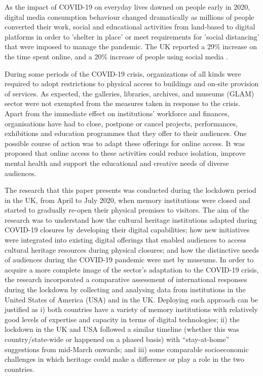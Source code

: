 \documentclass{egpubl}
\begin{document}
As the impact of COVID-19 on everyday lives dawned on people early in 2020, digital media consumption behaviour changed dramatically as millions of people converted their work, social and educational activities from land-based to digital platforms in order to 'shelter in place' or meet requirements for 'social distancing' that were imposed to manage the pandemic. The UK reported a 29\% increase on the time spent online, and a 20\% increase of people using social media \cite{ofcom:2020}. 

During some periods of the COVID-19 crisis, organizations of all kinds were required to adopt restrictions to physical access to buildings and on-site provision of services. As expected, the galleries, libraries, archives, and museums (GLAM) sector were not exempted from the measures taken in response to the crisis. Apart from the immediate effect on institutions' workforce and finances, organisations have had to close, postpone or cancel projects, performances, exhibitions and education programmes that they offer to their audiences. One possible course of action was to adapt these offerings for online access. It was proposed that online access to these activities could reduce isolation, improve mental health and support the educational and creative needs of diverse audiences.

The research that this paper presents was conducted during the lockdown period in the UK, from April to July 2020, when memory institutions were closed and started to gradually re-open their physical premises to visitors. The aim of the research was to understand how the cultural heritage institutions adapted during COVID-19 closures by developing their digital capabilities; how new initiatives were integrated into existing digital offerings that enabled audiences to access cultural heritage resources during physical closures; and how the distinctive needs of audiences during the COVID-19 pandemic were met by museums. In order to acquire a more complete image of the sector's adaptation to the COVID-19 crisis, the research incorporated a comparative assessment of international responses during the lockdown by collecting and analysing data from institutions in the United States of America (USA) and in the UK. Deploying such approach can be justified as i) both countries have a variety of memory institutions with relatively good levels of expertise and capacity in terms of digital technologies; ii) the lockdown in the UK and USA followed a similar timeline (whether this was country/state-wide or happened on a phased basis) with ``stay-at-home'' suggestions from mid-March onwards; and iii) some comparable socioeconomic challenges in which heritage could make a difference or play a role in the two countries. 
\end{document}

